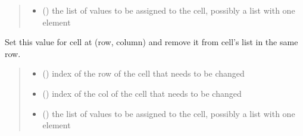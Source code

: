 \documentclass[letterpaper,10pt,english]{sphinxmanual}
\begin{document}
\begin{fulllineitems}
\begin{fulllineitems}
\begin{quote}
\begin{description}
\begin{itemize}
\item {} 
\sphinxAtStartPar
{} () \textendash{} the list of values to be assigned to the cell,            possibly a list with one element

\end{itemize}

\end{description}\end{quote}

\end{fulllineitems}


\begin{fulllineitems}
\label{\detokenize{condition_analysis:condition_analysis.CondBoard.setNdelValueRow}}
\pysigstartsignatures
{}
\pysigstopsignatures
\sphinxAtStartPar
Set this value for cell at (row, column)
and remove it from cell’s list in the same row.
\begin{quote}\begin{description}
\begin{itemize}
\item {} 
\sphinxAtStartPar
{} () \textendash{} index of the row of the cell that needs to be changed

\item {} 
\sphinxAtStartPar
{} () \textendash{} index of the col of the cell that needs to be changed

\item {} 
\sphinxAtStartPar
{} () \textendash{} the list of values to be assigned to the cell,            possibly a list with one element

\end{itemize}


\end{description}
\end{quote}
\end{fulllineitems}
\end{fulllineitems}
\end{document}
